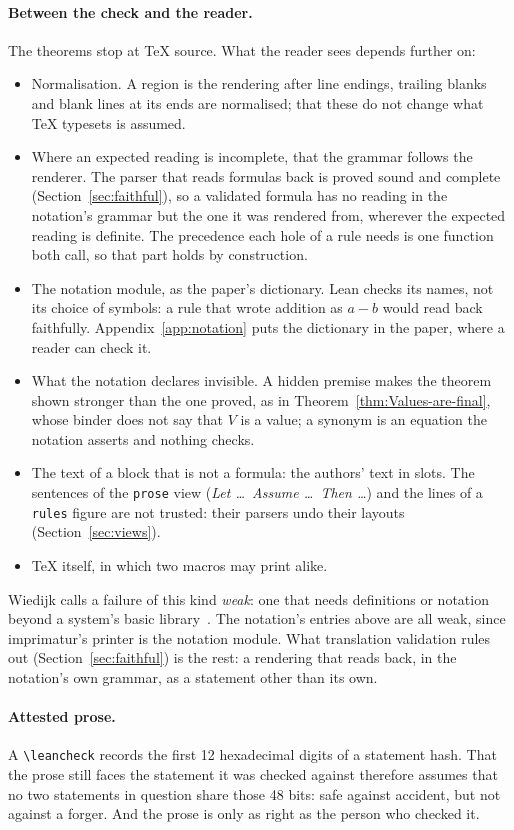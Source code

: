 \documentclass[acmsmall,screen,review,anonymous,nonacm]{acmart}
\begin{document}
\paragraph{Between the check and the reader.} The theorems stop at \TeX{}
source. What the reader sees depends further on:
\begin{itemize}
\item Normalisation. A region is the rendering after line endings,
  trailing blanks and blank lines at its ends are normalised; that these
  do not change what \TeX{} typesets is assumed.
\item Where an expected reading is incomplete, that the grammar follows
  the renderer. The parser that reads formulas back is proved sound and
  complete (Section~\ref{sec:faithful}), so a validated formula has no
  reading in the notation's grammar but the one it was rendered from,
  wherever the expected reading is definite. The precedence each hole of a
  rule needs is one function both call, so that part holds by
  construction.
\item The notation module, as the paper's dictionary. Lean checks its names,
  not its choice of symbols: a rule that wrote addition as $a - b$ would read
  back faithfully. Appendix~\ref{app:notation} puts the dictionary in the
  paper, where a reader can check it.
\item What the notation declares invisible. A hidden premise makes the
  theorem shown stronger than the one proved, as in Theorem~\ref{thm:Values-are-final}, whose
  binder does not say that $V$ is a value; a synonym is an equation the
  notation asserts and nothing checks.
\item The text of a block that is not a formula: the authors' text in
  slots. The sentences of the \verb|prose| view (\emph{Let \ldots\
  Assume \ldots\ Then \ldots}) and the lines of a \verb|rules| figure are
  not trusted: their parsers undo their layouts
  (Section~\ref{sec:views}).
\item \TeX{} itself, in which two macros may print alike.
\end{itemize}
Wiedijk calls a failure of this kind \emph{weak}: one that needs
definitions or notation beyond a system's basic library~\cite{Wiedijk12}.
The notation's entries above are all weak, since imprimatur's printer is
the notation module. What translation validation rules out
(Section~\ref{sec:faithful}) is the rest: a rendering that reads back, in
the notation's own grammar, as a statement other than its own.

\paragraph{Attested prose.} A \verb|\leancheck| records the first 12
hexadecimal digits of a statement hash. That the prose still faces the
statement it was checked against therefore assumes that no two statements
in question share those 48 bits: safe against accident, but not against a
forger. And the prose is only as right as the person who checked it.
\end{document}
